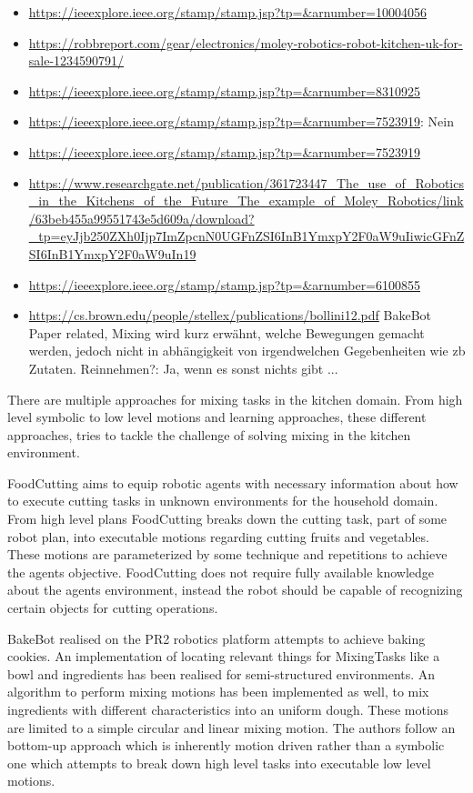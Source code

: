 \begin{itemize}
    \item \url{https://ieeexplore.ieee.org/stamp/stamp.jsp?tp=&arnumber=10004056}
    \item \url{https://robbreport.com/gear/electronics/moley-robotics-robot-kitchen-uk-for-sale-1234590791/}
    \item \url{https://ieeexplore.ieee.org/stamp/stamp.jsp?tp=&arnumber=8310925}
    \item \url{https://ieeexplore.ieee.org/stamp/stamp.jsp?tp=&arnumber=7523919}: Nein
    \item \url{https://ieeexplore.ieee.org/stamp/stamp.jsp?tp=&arnumber=7523919}
    \item \url{https://www.researchgate.net/publication/361723447_The_use_of_Robotics_in_the_Kitchens_of_the_Future_The_example_of_Moley_Robotics/link/63beb455a99551743e5d609a/download?_tp=eyJjb250ZXh0Ijp7ImZpcnN0UGFnZSI6InB1YmxpY2F0aW9uIiwicGFnZSI6InB1YmxpY2F0aW9uIn19}
    \item \url{https://ieeexplore.ieee.org/stamp/stamp.jsp?tp=&arnumber=6100855}
    \item \url{https://cs.brown.edu/people/stellex/publications/bollini12.pdf} BakeBot Paper related, Mixing wird kurz erwähnt, welche Bewegungen gemacht werden, jedoch nicht in abhängigkeit von irgendwelchen Gegebenheiten wie zb Zutaten. Reinnehmen?: Ja, wenn es sonst nichts gibt ...
\end{itemize}

There are multiple approaches for mixing tasks in the kitchen domain. From high level symbolic to low level motions and 
learning approaches, these different approaches, tries to tackle the challenge of solving mixing in the kitchen environment.

FoodCutting aims to equip robotic agents with necessary information about how to 
execute  cutting tasks in unknown environments for the household domain. From high level plans FoodCutting breaks down 
the cutting task, part of some robot plan, into executable motions regarding cutting fruits and vegetables. These motions are parameterized 
by some technique and repetitions to achieve the agents objective. 
FoodCutting does not require fully available knowledge
about the agents environment, instead the robot should be capable of recognizing certain objects for cutting 
operations. 

BakeBot realised on the PR2 robotics platform attempts to achieve baking cookies. An implementation of locating relevant things for MixingTasks
like a bowl and ingredients has been realised for semi-structured environments. An algorithm to perform mixing motions has been implemented as well, to mix 
ingredients with different characteristics into an uniform dough. These motions are limited to a simple circular and linear mixing motion.
The authors follow an bottom-up approach which is inherently motion driven rather than a
symbolic one which attempts to break down high level tasks into executable low level motions. 

